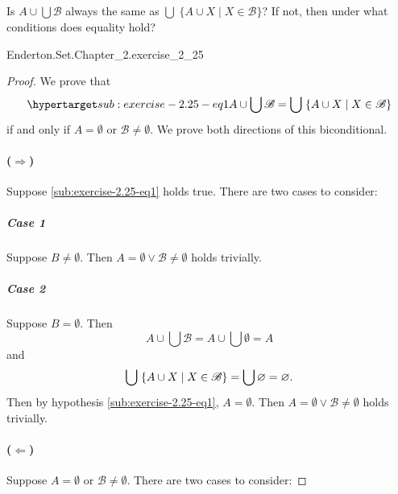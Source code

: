 \documentclass{report}
\begin{document}
\subsection{}%

  Is $A \cup \bigcup \mathscr{B}$ always the same as
    $\bigcup\;\{ A \cup X \mid X \in \mathscr{B} \}$?
  If not, then under what conditions does equality hold?

    {Enderton.Set.Chapter\_2.exercise\_2\_25}

  \begin{proof}
    We prove that
      \begin{equation}
        \hyperlabel{sub:exercise-2.25-eq1}
        A \cup \bigcup \mathscr{B} =
          \bigcup\;\{ A \cup X \mid X \in \mathscr{B} \}
      \end{equation}
      if and only if $A = \emptyset$ or $\mathscr{B} \neq \emptyset$.
    We prove both directions of this biconditional.

    \paragraph{($\Rightarrow$)}%

      Suppose \eqref{sub:exercise-2.25-eq1} holds true.
      There are two cases to consider:

      \subparagraph{Case 1}%

        Suppose $B \neq \emptyset$.
        Then $A = \emptyset \lor \mathscr{B} \neq \emptyset$ holds trivially.

      \subparagraph{Case 2}%

        Suppose $B = \emptyset$.
        Then $$A \cup \bigcup \mathscr{B} = A \cup \bigcup \emptyset = A$$ and
          $$
            \bigcup\;\{ A \cup X \mid X \in \mathscr{B} \}
              = \bigcup \emptyset \\
              = \emptyset.
          $$
        Then by hypothesis \eqref{sub:exercise-2.25-eq1}, $A = \emptyset$.
        Then $A = \emptyset \lor \mathscr{B} \neq \emptyset$ holds trivially.

    \paragraph{($\Leftarrow$)}%

      Suppose $A = \emptyset$ or $\mathscr{B} \neq \emptyset$.
      There are two cases to consider:


\end{proof}
\end{document}
